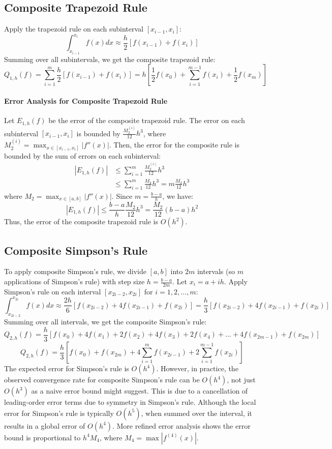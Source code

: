 \documentclass{article}
\begin{document}
\subsection{Composite Trapezoid Rule}

Apply the trapezoid rule on each subinterval $[x_{i-1}, x_i]$:
\[
\int_{x_{i-1}}^{x_i} f(x) dx \approx \frac{h}{2} [f(x_{i-1}) + f(x_i)]
\]
Summing over all subintervals, we get the composite trapezoid rule:
\[
Q_{1,h}(f) = \sum_{i=1}^m \frac{h}{2} [f(x_{i-1}) + f(x_i)] = h \left[ \frac{1}{2}f(x_0) + \sum_{i=1}^{m-1} f(x_i) + \frac{1}{2}f(x_m) \right]
\]

\paragraph{Error Analysis for Composite Trapezoid Rule}
Let $E_{1,h}(f)$ be the error of the composite trapezoid rule. The error on each subinterval $[x_{i-1}, x_i]$ is bounded by $\frac{M_2^{(i)}}{12} h^3$, where $M_2^{(i)} = \max_{x \in [x_{i-1}, x_i]} |f''(x)|$.
Then, the error for the composite rule is bounded by the sum of errors on each subinterval:
\begin{align*}
|E_{1,h}(f)| &\leq \sum_{i=1}^m \frac{M_2^{(i)}}{12} h^3 \\
&\leq \sum_{i=1}^m \frac{M_2}{12} h^3 = m \frac{M_2}{12} h^3
\end{align*}
where $M_2 = \max_{x \in [a, b]} |f''(x)|$. Since $m = \frac{b-a}{h}$, we have:
\[
|E_{1,h}(f)| \leq \frac{b-a}{h} \frac{M_2}{12} h^3 = \frac{M_2}{12} (b-a) h^2
\]
Thus, the error of the composite trapezoid rule is $O(h^2)$.

\subsection{Composite Simpson's Rule}

To apply composite Simpson's rule, we divide $[a, b]$ into $2m$ intervals (so $m$ applications of Simpson's rule) with step size $h = \frac{b-a}{2m}$. Let $x_i = a + ih$. Apply Simpson's rule on each interval $[x_{2i-2}, x_{2i}]$ for $i = 1, 2, \dots, m$:
\[
\int_{x_{2i-2}}^{x_{2i}} f(x) dx \approx \frac{2h}{6} [f(x_{2i-2}) + 4f(x_{2i-1}) + f(x_{2i})] = \frac{h}{3} [f(x_{2i-2}) + 4f(x_{2i-1}) + f(x_{2i})]
\]
Summing over all intervals, we get the composite Simpson's rule:
\[
Q_{2,h}(f) = \frac{h}{3} \left[ f(x_0) + 4f(x_1) + 2f(x_2) + 4f(x_3) + 2f(x_4) + \dots + 4f(x_{2m-1}) + f(x_{2m}) \right]
\]
\[
Q_{2,h}(f) = \frac{h}{3} \left[ f(x_0) + f(x_{2m}) + 4 \sum_{i=1}^{m} f(x_{2i-1}) + 2 \sum_{i=1}^{m-1} f(x_{2i}) \right]
\]
The expected error for Simpson's rule is $O(h^4)$.  However, in practice, the observed convergence rate for composite Simpson's rule can be $O(h^4)$, not just $O(h^3)$ as a naive error bound might suggest. This is due to a cancellation of leading-order error terms due to symmetry in Simpson's rule. Although the local error for Simpson's rule is typically $O(h^5)$, when summed over the interval, it results in a global error of $O(h^4)$. More refined error analysis shows the error bound is proportional to $h^4 M_4$, where $M_4 = \max |f^{(4)}(x)|$.
\end{document}
